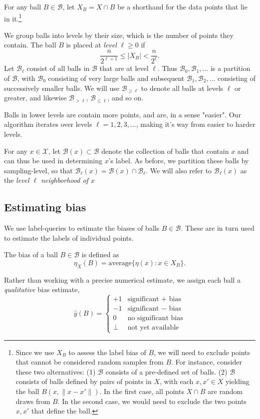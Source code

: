 \documentclass{article}
\def\X{{\mathcal X}}
\def\B{{\mathcal B}}
\def\yh{{\widehat{y}}}
\begin{document}
For any ball $B \in \B$, let $X_B = X \cap B$ be a shorthand for the
data points that lie in it.\footnote{Since we use $X_B$ to assess the
  label bias of $B$, we will need to exclude points that cannot be
  considered random samples from $B$. For instance, consider these two
  alternatives: (1) $\B$ consists of a pre-defined set of balls. (2)
  $\B$ consists of balls defined by pairs of points in $X$, with each
  $x,x' \in X$ yielding the ball $B(x,\|x-x'\|)$. In the first case,
  all points $X \cap B$ are random draws from $B$. In the second case,
  we would need to exclude the two points $x,x'$ that define the
  ball.}

We group balls into levels by their size, which is the number of
points they contain. The ball $B$ is placed at {\it level}
$\ell \geq 0$ if
\begin{equation}
\frac{n}{2^{\ell + 1}} \leq |X_B| < \frac{n}{2^\ell} .
\label{eq:sampling-level}
\end{equation}
Let $\B_\ell$ consist of all balls in $\B$ that are at level $\ell$. Thus $\B_0, \B_1, \ldots$ is a partition of $\B$, with $\B_0$ consisting of very large balls and subsequent $\B_1, \B_2, \ldots$ consisting of successively smaller balls. We will use $\B_{\geq \ell}$ to denote all balls at levels $\ell$ or greater, and likewise $\B_{> \ell}$, $\B_{\leq \ell}$, and so on. 

Balls in lower levels are contain more points, and are, in a sense "easier". 
Our algorithm iterates over levels $\ell=1,2,3,\ldots$, making it's way from easier to harder levels.

For any $x \in \X$, let $\B(x) \subset \B$ denote the collection of balls that contain $x$ and can thus be used in determining $x$'s label. As before, we partition these balls by sampling-level, so that $\B_\ell(x) = \B(x) \cap \B_\ell$. We will also refer to $\B_\ell(x)$ as the {\em level $\ell$ neighborhood of $x$}

\subsection{Estimating bias}

We use label-queries to estimate the biases of balls $B \in \B$. 
These are in turn used to estimate the labels of individual points.

The bias of a ball $B \in \B$ is defined as
$$ \eta_X(B) = \mbox{average}\{\eta(x): x \in X_B \} .$$

Rather than working with a precise numerical estimate, we assign each ball a \emph{qualitative} bias estimate,
$$ \yh(B) = 
\left\{
\begin{array}{cl}
+1 & \mbox{significant $+$ bias} \\
-1 & \mbox{significant $-$ bias} \\
0 & \mbox{no significant bias} \\
\bot & \mbox{not yet available}
\end{array}
\right.
$$
\end{document}
